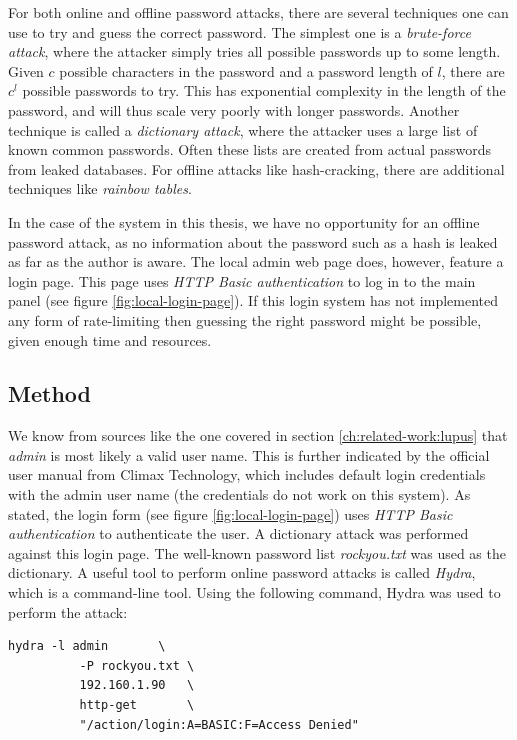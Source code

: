 For both online and offline password attacks, there are several techniques one can use to try and guess the correct password. The simplest one is a \textit{brute-force attack}, where the attacker simply tries all possible passwords up to some length. Given $c$ possible characters in the password and a password length of $l$, there are $c^l$ possible passwords to try. This has exponential complexity in the length of the password, and will thus scale very poorly with longer passwords. Another technique is called a \textit{dictionary attack}, where the attacker uses a large list of known common passwords. Often these lists are created from actual passwords from leaked databases. For offline attacks like hash-cracking, there are additional techniques like \textit{rainbow tables}.

In the case of the system in this thesis, we have no opportunity for an offline password attack, as no information about the password such as a hash is leaked as far as the author is aware. The local admin web page does, however, feature a login page. This page uses \textit{HTTP Basic authentication} to log in to the main panel (see figure \ref{fig:local-login-page}). If this login system has not implemented any form of rate-limiting then guessing the right password might be possible, given enough time and resources.

\subsection{Method}
We know from sources like the one covered in section \ref{ch:related-work:lupus} that \textit{admin} is most likely a valid user name. This is further indicated by the official user manual from Climax Technology, which includes default login credentials with the admin user name (the credentials do not work on this system). As stated, the login form (see figure \ref{fig:local-login-page}) uses \textit{HTTP Basic authentication} to authenticate the user. A dictionary attack was performed against this login page. The well-known password list \textit{rockyou.txt} was used as the dictionary. A useful tool to perform online password attacks is called \textit{Hydra}, which is a command-line tool. Using the following command, Hydra was used to perform the attack:
\begin{lstlisting}[frame=tb]
    hydra -l admin       \
          -P rockyou.txt \
          192.160.1.90   \
          http-get       \
          "/action/login:A=BASIC:F=Access Denied"
\end{lstlisting}

